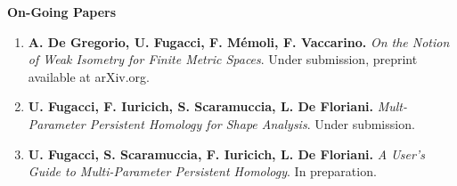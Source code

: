 \documentclass[11pt]{article}
\begin{document}
\noindent
{\bf On-Going Papers}
\begin{enumerate}

\item {\bf A. De Gregorio, U. Fugacci, F. M\'emoli, F. Vaccarino.} {\em On the Notion of Weak Isometry for Finite Metric Spaces}. Under submission, preprint available at arXiv.org.

\item {\bf U. Fugacci, F. Iuricich, S. Scaramuccia, L. De Floriani.} {\em Mult-Parameter Persistent Homology for Shape Analysis}. Under submission.

\item{\bf U. Fugacci, S. Scaramuccia, F. Iuricich, L. De Floriani.} {\em A User's Guide to Multi-Parameter Persistent Homology}. In preparation.





%
%
%
%
%




\end{enumerate}
\end{document}
